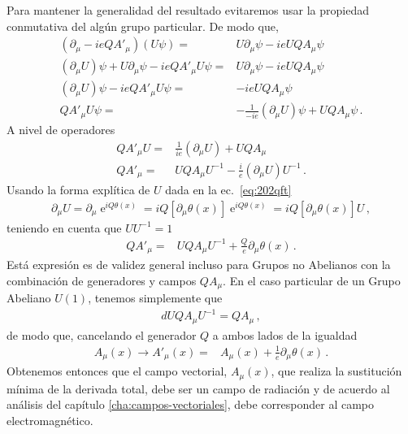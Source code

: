 \begin{frame}
Para mantener la generalidad del resultado evitaremos usar la propiedad conmutativa del algún grupo particular. De modo que,
\begin{align}
    \left( \partial_{\mu}-ieQ A'_{\mu} \right)\left(U\psi\right) =&U\partial_{\mu}\psi-ie  UQA_{\mu}\psi \nonumber\\
    \left( \partial_{\mu}U \right)\psi+U \partial_{\mu}\psi -ie QA'_{\mu}U\psi =&U\partial_{\mu}\psi-ie  U QA_{\mu}\psi \nonumber\\
    \left( \partial_{\mu}U \right)\psi -ie QA'_{\mu}U\psi =&-ie  U QA_{\mu}\psi \nonumber\\
      QA'_{\mu}U\psi =&- \frac{1}{-ie}\left( \partial_{\mu}U \right)\psi + U QA_{\mu}\psi \,.
\end{align}
A nivel de operadores
\begin{align}
      QA'_{\mu}U =&\frac{1}{ie}\left( \partial_{\mu}U \right) + U QA_{\mu} \nonumber\\
      QA'_{\mu} =& U QA_{\mu} U^{-1}-\frac{i}{e}\left( \partial_{\mu}U \right)U^{-1}\,.
\end{align}
Usando la forma explítica de $U$ dada en la ec.~\eqref{eq:202qft}
\begin{align}
  \partial_{\mu}U=  \partial_{\mu} \operatorname{e}^{iQ\theta(x)}=iQ \left[ \partial_{\mu}\theta(x) \right]\operatorname{e}^{iQ\theta(x)}
  =iQ \left[ \partial_{\mu}\theta(x) \right]U\,,
\end{align}
teniendo en cuenta que $U U^{-1}=1$
\begin{align}
  \label{eq:gnrlaggtr}
       QA'_{\mu} =& U QA_{\mu} U^{-1}+\frac{Q}{e}\partial_{\mu}\theta(x) \,.
\end{align}
Está expresión es de validez general incluso para Grupos no Abelianos con la combinación de generadores y campos $QA_{\mu}$. En el caso particular de un Grupo Abeliano  $U(1)$, tenemos simplemente que
\begin{align}d
  UQA_{\mu}U^{-1}=QA_{\mu}\,,
\end{align}
de modo que, cancelando el generador $Q$ a ambos lados de la igualdad
\begin{align}
  \label{eq:radfielde}
  A_{\mu}(x)\to  A'_{\mu}(x)=&A_{\mu}(x)+\frac{1}{e}\partial_{\mu}\theta(x)\,.
\end{align}
Obtenemos entonces que el campo vectorial, $A_{\mu}(x)$, que realiza la sustitución mínima de la derivada total, debe ser un campo de radiación y de acuerdo al análisis del capítulo \ref{cha:campos-vectoriales}, debe corresponder al campo electromagnético.  


\end{frame}
